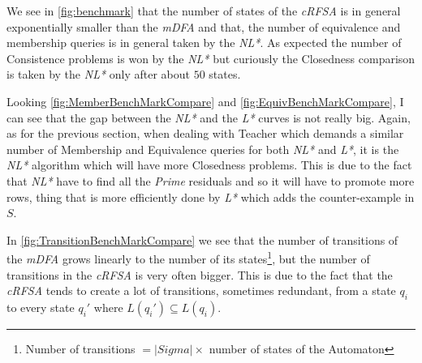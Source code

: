 We see in \cref{fig:benchmark} that the number of states of the \textit{cRFSA} is in general exponentially smaller than the \textit{mDFA} and that, the number of equivalence and membership queries is in general taken by the \textit{NL*}. As expected the number of Consistence problems is won by the \textit{NL*} but curiously the Closedness comparison is taken by the \textit{NL*} only after about $50$ states.

Looking \cref{fig:MemberBenchMarkCompare} and \cref{fig:EquivBenchMarkCompare}, I can see that the gap between the \textit{NL*} and the \textit{L*} curves is not really big. Again, as for the previous section, when dealing with Teacher which demands a similar number of Membership and Equivalence queries for both \textit{NL*} and \textit{L*}, it is the \textit{NL*} algorithm which will have more Closedness problems. This is due to the fact that \textit{NL*} have to find all the \textit{Prime} residuals and so it will have to promote more rows, thing that is more efficiently done by \textit{L*} which adds the counter-example in $S$.

In \cref{fig:TransitionBenchMarkCompare} we see that the number of transitions of the \textit{mDFA} grows linearly to the number of its states\footnote{Number of transitions $= |Sigma| \times$ number of states of the Automaton}, but the number of transitions in the \textit{cRFSA} is very often bigger. This is due to the fact that the \textit{cRFSA} tends to create a lot of transitions, sometimes redundant, from a state $q_i$ to every state $q_i'$ where $L(q_i') \subseteq L(q_i)$.